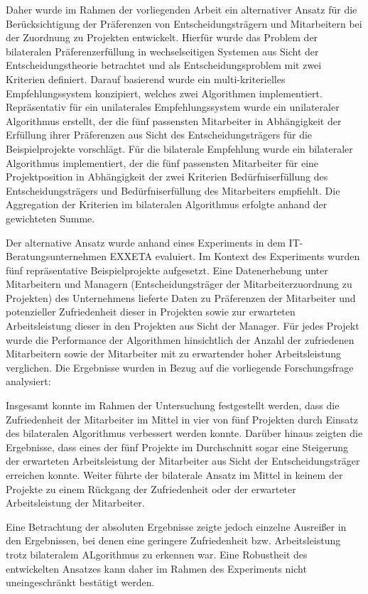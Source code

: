 Daher wurde im Rahmen der vorliegenden Arbeit ein alternativer Ansatz für die Berücksichtigung der Präferenzen von Entscheidungsträgern und Mitarbeitern bei der Zuordnung zu Projekten entwickelt.
Hierfür wurde das Problem der bilateralen Präferenzerfüllung in wechselseitigen Systemen aus Sicht der Entscheidungstheorie betrachtet und als Entscheidungsproblem mit zwei Kriterien definiert.
Darauf basierend wurde ein multi-kriterielles Empfehlungssystem konzipiert, welches zwei Algorithmen implementiert.
Repräsentativ für ein unilaterales Empfehlungssystem wurde ein unilateraler Algorithmus erstellt, der die fünf passensten Mitarbeiter in Abhängigkeit der Erfüllung ihrer Präferenzen aus Sicht des Entscheidungsträgers für die Beispielprojekte vorschlägt.
Für die bilaterale Empfehlung wurde ein bilateraler Algorithmus implementiert, der die fünf passensten Mitarbeiter für eine Projektposition in Abhängigkeit der zwei Kriterien Bedürfniserfüllung des Entscheidungsträgers und Bedürfniserfüllung des Mitarbeiters empfiehlt.
Die Aggregation der Kriterien im bilateralen Algorithmus erfolgte anhand der gewichteten Summe.

Der alternative Ansatz wurde anhand eines Experiments in dem IT-Bera\-tungsunternehmen EXXETA evaluiert.
Im Kontext des Experiments wurden fünf repräsentative Beispielprojekte aufgesetzt.
Eine Datenerhebung unter Mitarbeitern und Managern (Entscheidungsträger der Mitarbeiterzuordnung zu Projekten) des Unternehmens lieferte Daten zu Präferenzen der Mitarbeiter und potenzieller Zufriedenheit dieser in Projekten sowie zur erwarteten Arbeitsleistung dieser in den Projekten aus Sicht der Manager.
Für jedes Projekt wurde die Performance der Algorithmen hinsichtlich der Anzahl der zufriedenen Mitarbeitern sowie der Mitarbeiter mit zu erwartender hoher Arbeitsleistung verglichen.
Die Ergebnisse wurden in Bezug auf die vorliegende Forschungsfrage analysiert:
\forschungsfrage

Insgesamt konnte im Rahmen der Untersuchung festgestellt werden, dass die Zufriedenheit der Mitarbeiter im Mittel in vier von fünf Projekten durch Einsatz des bilateralen Algorithmus verbessert werden konnte.
Darüber hinaus zeigten die Ergebnisse, dass eines der fünf Projekte im Durchschnitt sogar eine Steigerung der erwarteten Arbeitsleistung der Mitarbeiter aus Sicht der Entscheidungsträger erreichen konnte.
Weiter führte der bilaterale Ansatz im Mittel in keinem der Projekte zu einem Rückgang der Zufriedenheit oder der erwarteter Arbeitsleistung der Mitarbeiter.

Eine Betrachtung der absoluten Ergebnisse zeigte jedoch einzelne Ausreißer in den Ergebnissen, bei denen eine geringere Zufriedenheit bzw. Arbeitsleistung trotz bilateralem ALgorithmus zu erkennen war.
Eine Robustheit des entwickelten Ansatzes kann daher im Rahmen des Experiments nicht uneingeschränkt bestätigt werden.

